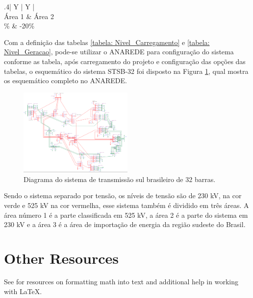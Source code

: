 \documentclass[lettersize,journal]{IEEEtran}
\begin{document}
\begin{table}[ht]
	\caption{Configuração do Nível de Carregamento(MW)}
	\label{tabela: Nivel_Geracao}
	\centering
	\begin{tabularx}{.4\textwidth}{| Y | Y |}
		\hline
		 \\
		\hline
		Área 1 & Área 2 \\
		\% & -20\% \\
		\hline
	\end{tabularx}
\end{table}

Com a definição das tabelas \ref{tabela: Nivel_Carregamento} e \ref{tabela: Nivel_Geracao}, pode-se utilizar o ANAREDE para configuração do sistema conforme as tabela, após carregamento do projeto e configuração das opções das tabelas, o esquemático do sistema STSB-32 foi disposto na Figura \ref{figura: Sistema_STSB_32}, qual mostra os esquemático completo no ANAREDE.

\begin{figure}[h]
	\includegraphics[width=0.5\textwidth]{Figuras/STSB-32.png}
	\centering
	\caption{Diagrama do sistema de transmissão sul brasileiro de 32 barras.}
	\label{figura: Sistema_STSB_32}
\end{figure}

Sendo o sistema separado por tensão, os níveis de tensão são de 230 kV, na cor verde e 525 kV na cor vermelha, esse sistema também é dividido em três áreas. A área número 1 é a parte classificada em 525 kV, a área 2 é a parte do sistema em 230 kV e a área 3 é a área de importação de energia da região sudeste do Brasil.



\section{Other Resources}
See for resources on formatting math into text and additional help in working with \LaTeX .
\end{document}
